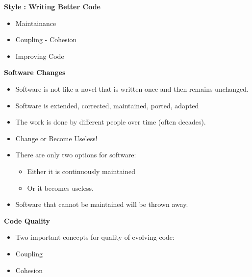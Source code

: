 \documentclass{beamer}
\begin{document}
\begin{frame}
\begin{center}
\textbf{Style : Writing Better Code}
\end{center}
\begin{itemize}
\item Maintainance 
\item Coupling - Cohesion 
\item Improving Code 
\end{itemize}
\end{frame}

\begin{frame}
\begin{center}
\textbf{Software Changes}
\end{center}
\begin{itemize}
\item Software is not like a novel that is written once and then remains unchanged.
\item Software is extended, corrected, maintained, ported, adapted
\item The work is done by different people over time (often decades).
\end{itemize}
\end{frame}

\begin{frame}
\begin{itemize}
\item Change or Become Useless!
\item There are only two options for software: 
\begin{itemize}
\item Either it is continuously maintained
\item Or it becomes useless.
\end{itemize}
\item Software that cannot be maintained will be thrown away.
\end{itemize}
\end{frame}

\begin{frame}
\begin{center}
\textbf{Code Quality}
\end{center}
\begin{itemize}
\item Two important concepts for quality of evolving code:
\bigskip
\item Coupling 
\item Cohesion
\end{itemize}
\end{frame}
\end{document}

